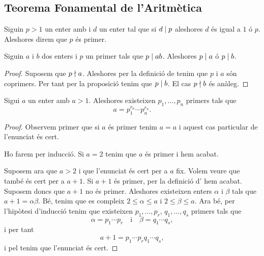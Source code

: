 \documentclass[../Apunts.tex]{subfiles}
\begin{document}
	\subsection{Teorema Fonamental de l'Aritmètica}
	\begin{definition}
		\label{def:enter primer}
		Siguin \(p>1\) un enter amb i \(d\) un enter tal que si \(d\mathrel{|} p\) aleshores \(d\) és igual a \(1\) ó \(p\). Aleshores direm que \(p\) és primer.
	\end{definition}
	\begin{proposition}
		\label{prop:Si un primer divideix al producte aleshores divideix els elements}
		Siguin \(a\) i \(b\) dos enters i \(p\) un primer tals que \(p\mathrel{|} ab\). Aleshores \(p\mathrel{|} a\) ó \(p\mathrel{|} b\).
		\begin{proof}
			Suposem que \(p\mathrel{\nmid} a\). Aleshores per la definició de  tenim que \(p\) i \(a\) són coprimers. Per tant per la proposició  tenim que \(p\mathrel{|} b\). El cas \(p\mathrel{\nmid} b\) és anàleg.
		\end{proof}
	\end{proposition}
	\begin{lemma}
		\label{lemma:thm:Teorema Fonamental de l'Aritmètica 1}
		Sigui \(a\) un enter amb \(a>1\). Aleshores existeixen \(p_{1},\dots,p_{n}\) primers tals que
		\[a=p_{1}^{r_{n}}\cdots p_{n}^{r_{n}}.\]
		\begin{proof}
			Observem primer que si \(a\) és primer tenim \(a=a\) i aquest cas particular de l'enunciat és cert.
			
			Ho farem per inducció. Si \(a=2\) tenim que \(a\) és primer i hem acabat.
			
			Suposem ara que \(a>2\) i que l'enunciat és cert per a \(a\) fix. Volem veure que també és cert per a \(a+1\). Si \(a+1\) és primer, per la definició d' hem acabat. Suposem doncs que \(a+1\) no és primer. Aleshores existeixen enters \(\alpha\) i \(\beta\) tals que \(a+1=\alpha\beta\). Bé, tenim que es compleix \(2\leq\alpha\leq a\) i \(2\leq\beta\leq a\). Ara bé, per l'hipòtesi d'inducció tenim que existeixen \(p_{1},\dots,p_{r}\), \(q_{1},\dots,q_{s}\) primers tals que
			\[\alpha=p_{1}\cdots p_{r}\quad\text{i}\quad\beta=q_{1}\cdots q_{s},\]
			i per tant
			\[a+1=p_{1}\cdots p_{r}q_{1}\cdots q_{s},\]
			i pel  tenim que l'enunciat és cert.
		\end{proof}
	\end{lemma}
\end{document}
